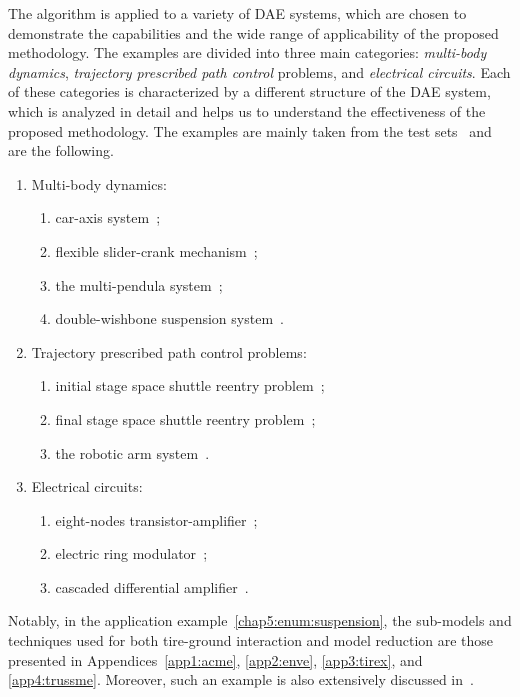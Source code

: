 The algorithm is applied to a variety of \ac{DAE} systems, which are chosen to demonstrate the capabilities and the wide range of applicability of the proposed methodology. The examples are divided into three main categories: \emph{multi-body dynamics}, \emph{trajectory prescribed path control} problems, and \emph{electrical circuits}. Each of these categories is characterized by a different structure of the \ac{DAE} system, which is analyzed in detail and helps us to understand the effectiveness of the proposed methodology. The examples are mainly taken from the test sets~\cite{lioen1998test, mazzia2003test, mazzia2008test, mazzia2012test} and are the following.
%
\begin{enumerate}
  \setlength\itemsep{0.0em}
  \item Multi-body dynamics:
  \begin{enumerate}
    \setlength\itemsep{0.0em}
    \item car-axis system~\cite{lioen1998test, mazzia2008test};
    \item flexible slider-crank mechanism~\cite{lioen1998test, mazzia2008test};
    \item the multi-pendula system~\cite{nedialkov2008solvingIII};
    \item double-wishbone suspension system~\cite{lioen1998test, mazzia2008test}. \label{chap5:enum:suspension}
  \end{enumerate}
  \item Trajectory prescribed path control problems:
  \begin{enumerate}
    \setlength\itemsep{0.0em}
    \item initial stage space shuttle reentry problem~\cite{brenan1995numerical};
    \item final stage space shuttle reentry problem~\cite{brenan1995numerical};
    \item the robotic arm system~\cite{pryce1998solving}.
  \end{enumerate}
  \item Electrical circuits:
  \begin{enumerate}
    \setlength\itemsep{0.0em}
    \item eight-nodes transistor-amplifier~\cite{lioen1998test, mazzia2008test};
    \item electric ring modulator~\cite{lioen1998test, mazzia2008test};
    \item cascaded differential amplifier~\cite{brenan1995numerical}.
  \end{enumerate}
\end{enumerate}
%
Notably, in the application example~\ref{chap5:enum:suspension}, the sub-models and techniques used for both tire-ground interaction and model reduction are those presented in Appendices~\ref{app1:acme}, \ref{app2:enve}, \ref{app3:tirex}, and \ref{app4:trussme}. Moreover, such an example is also extensively discussed in~\cite{larcher2024imece_symbolic, stocco2024trussme}.

